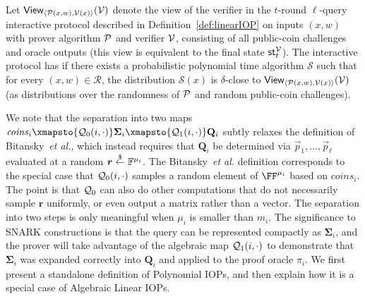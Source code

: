 \begin{definition}
Let $\textsf{View}_{\langle \mathcal{P}(x, w), \mathcal{V}(x) \rangle}(\mathcal{V})$ denote the view of the verifier in the $t$-round $\ell$-query interactive protocol described in Definition~\ref{def:linearIOP} on inputs $(x,w)$ with prover algorithm $\mathcal{P}$ and verifier $\mathcal{V}$, consisting of all public-coin challenges and oracle outputs (this view is equivalent to the final state $\textsf{st}^\mathcal{V}_t$). The interactive protocol has  if there exists a probabilistic polynomial time algorithm $\mathcal{S}$ such that for every $(x, w) \in \mathcal{R}$, the distribution $\mathcal{S}(x)$ is $\delta$-close to $\textsf{View}_{\langle \mathcal{P}(x, w), \mathcal{V}(x) \rangle}(\mathcal{V})$ (as distributions over the randomness of $\mathcal{P}$ and random public-coin challenges).
\end{definition}

We note that the separation into two maps $\mathit{coins}_i \xmapsto{\qgen_0(i, \cdot)} \boldsymbol{\Sigma}_i \xmapsto{\qgen_1(i, \cdot)} \mathbf{Q}_i$ subtly relaxes the definition of Bitansky~\emph{et al.}, which instead requires that $\mathbf{Q}_i$ be determined via $\vec{p}_1, \ldots, \vec{p}_\ell$ evaluated at a random $\boldsymbol{r} \overset{\$}{\gets} \mathbb{F}^{\mu_i}$. The Bitansky~\emph{et al.} definition corresponds to the special case that $\mathcal{Q}_0(i, \cdot)$ samples a random element of $\FF^{\mu_i}$ based on $\textit{coins}_i$. The point is that $\mathcal{Q}_0$ can also do other computations that do not necessarily sample $\boldsymbol{r}$ uniformly, or even output a matrix rather than a vector. The separation into two steps is only meaningful when $\mu_i$ is smaller than $m_i$. The significance to SNARK constructions is that the query can be represented compactly as $\boldsymbol{\Sigma}_i$, and the prover will take advantage of the algebraic map $\mathcal{Q}_1(i, \cdot)$ to demonstrate that $\boldsymbol{\Sigma}_i$ was expanded correctly into $\mathbf{Q}_i$ and applied to the proof oracle $\pi_i$. 
 We first present a standalone definition of Polynomial IOPs, and then explain how it is a special case of Algebraic Linear IOPs. 
 
